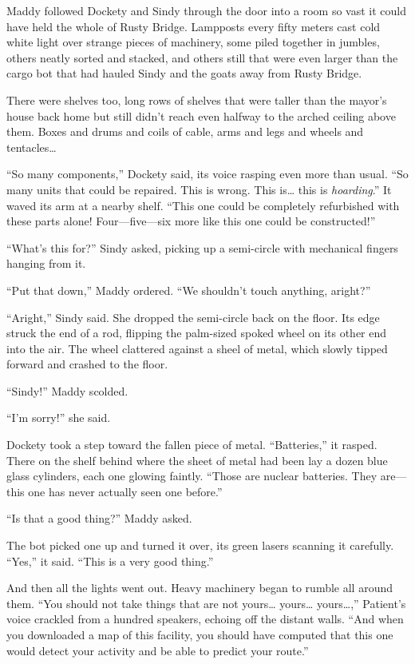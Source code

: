 \documentclass[10pt]{article}
\begin{document}
Maddy followed Dockety and Sindy through the door into a room so vast it
could have held the whole of Rusty Bridge. Lampposts every fifty meters
cast cold white light over strange pieces of machinery, some piled
together in jumbles, others neatly sorted and stacked, and others still
that were even larger than the cargo bot that had hauled Sindy and the
goats away from Rusty Bridge.

There were shelves too, long rows of shelves that were taller than the
mayor's house back home but still didn't reach even halfway to the
arched ceiling above them. Boxes and drums and coils of cable, arms and
legs and wheels and tentacles\ldots{}

``So many components,'' Dockety said, its voice rasping even more than
usual. ``So many units that could be repaired. This is wrong. This
is\ldots{} this is \emph{hoarding}.'' It waved its arm at a nearby
shelf. ``This one could be completely refurbished with these parts
alone! Four---five---six more like this one could be constructed!''

``What's this for?'' Sindy asked, picking up a semi-circle with
mechanical fingers hanging from it.

``Put that down,'' Maddy ordered. ``We shouldn't touch anything,
aright?''

``Aright,'' Sindy said. She dropped the semi-circle back on the floor.
Its edge struck the end of a rod, flipping the palm-sized spoked wheel
on its other end into the air. The wheel clattered against a sheel of
metal, which slowly tipped forward and crashed to the floor.

``Sindy!'' Maddy scolded.

``I'm sorry!'' she said.

Dockety took a step toward the fallen piece of metal. ``Batteries,'' it
rasped. There on the shelf behind where the sheet of metal had been lay
a dozen blue glass cylinders, each one glowing faintly. ``Those are
nuclear batteries. They are---this one has never actually seen one
before.''

``Is that a good thing?'' Maddy asked.

The bot picked one up and turned it over, its green lasers scanning it
carefully. ``Yes,'' it said. ``This is a very good thing.''

And then all the lights went out. Heavy machinery began to rumble all
around them. ``You should not take things that are not yours\ldots{}
yours\ldots{} yours\ldots{},'' Patient's voice crackled from a hundred
speakers, echoing off the distant walls. ``And when you downloaded a map
of this facility, you should have computed that this one would detect
your activity and be able to predict your route.''
\end{document}

